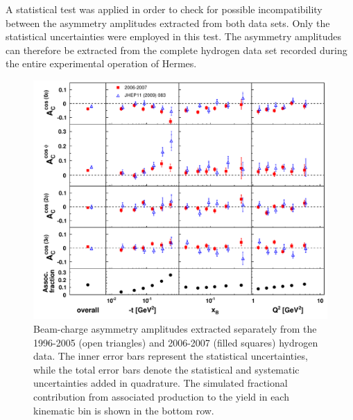 A statistical test was applied in order to check for possible incompatibility between the asymmetry amplitudes extracted from both data sets. Only the statistical uncertainties were employed in this test.  The  asymmetry amplitudes can therefore be extracted from the complete hydrogen data set recorded during the entire experimental operation of H{\sc ermes}.
\begin{figure}
\begin{center}
 \includegraphics[width=15cm,keepaspectratio]{bcaplots_eml_par13_bin6_release_pic_update_0607_9605_withassoc}
  \caption{Beam-charge asymmetry amplitudes extracted separately from the 1996-2005 (open triangles) and 2006-2007 (filled squares) hydrogen data.
The inner error bars represent the statistical uncertainties, while the total error bars denote the statistical and systematic uncertainties added in quadrature. The simulated fractional contribution from associated production to the yield in each kinematic bin is shown in the bottom row.}
 \label{release_bca_0607}
\end{center}
 \end{figure}

